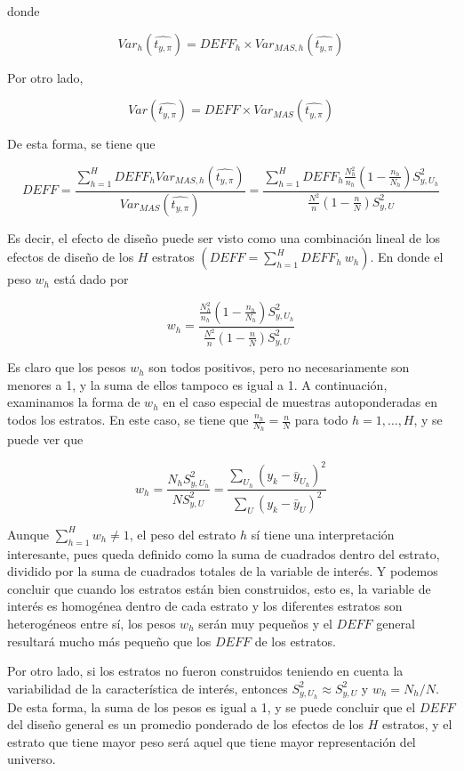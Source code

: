 \documentclass[
  12pt,
]{book}
\begin{document}
donde

\[
{Var}_h\left(\widehat{t_{y,\pi}}\right)={DEFF}_h \times {Var}_{MAS,h}\left(\widehat{t_{y,\pi}}\right)
\]

Por otro lado,

\[
Var\left(\widehat{t_{y,\pi}}\right)=DEFF \times {Var}_{MAS}\left(\widehat{t_{y,\pi}}\right)
\]

De esta forma, se tiene que

\[
DEFF=\frac{\sum_{h=1}^{H}DEFF_h{Var}_{MAS,h}\left(\widehat{t_{y,\pi}}\right)}{Var_{MAS}\left(\widehat{t_{y,\pi}}\right)}=\frac{\sum_{h=1}^{H}DEFF_h\frac{N_h^2}{n_h}(1-\frac{n_h}{N_h})S_{y,U_h}^2}{\frac{N^2}{n}(1-\frac{n}{N})S_{y,U}^2}
\]

Es decir, el efecto de diseño puede ser visto como una combinación lineal de los efectos de diseño de los \(H\) estratos \((DEFF=\sum_{h=1}^{H} DEFF_h \ w_h)\). En donde el peso \(w_h\) está dado por

\[
w_h=\frac{\frac{N_h^2}{n_h}(1-\frac{n_h}{N_h})S_{y,U_h}^2}{\frac{N^2}{n}(1-\frac{n}{N})S_{y,U}^2}
\]

Es claro que los pesos \(w_h\) son todos positivos, pero no necesariamente son menores a 1, y la suma de ellos tampoco es igual a 1. A continuación, examinamos la forma de \(w_h\) en el caso especial de muestras autoponderadas en todos los estratos. En este caso, se tiene que \(\frac{n_h}{N_h}=\frac{n}{N}\) para todo \(h=1,\ldots,H\), y se puede ver que

\[
w_h=\frac{N_hS_{y,U_h}^2}{NS_{y,U}^2}=\frac{\sum_{U_h}{(y_k-{\bar{y}}_{U_h})}^2}{\sum_{U}{(y_k-{\bar{y}}_U)}^2}
\]

Aunque \(\sum_{h=1}^{H}w_h\neq 1\), el peso del estrato \(h\) sí tiene una interpretación interesante, pues queda definido como la suma de cuadrados dentro del estrato, dividido por la suma de cuadrados totales de la variable de interés. Y podemos concluir que cuando los estratos están bien construidos, esto es, la variable de interés es homogénea dentro de cada estrato y los diferentes estratos son heterogéneos entre sí, los pesos \(w_h\) serán muy pequeños y el \(DEFF\) general resultará mucho más pequeño que los \(DEFF\) de los estratos.

Por otro lado, si los estratos no fueron construidos teniendo en cuenta la variabilidad de la característica de interés, entonces \(S_{y,U_h}^2\approx S_{y,U}^2\) y \(w_h=N_h/N\). De esta forma, la suma de los pesos es igual a 1, y se puede concluir que el \(DEFF\) del diseño general es un promedio ponderado de los efectos de los \(H\) estratos, y el estrato que tiene mayor peso será aquel que tiene mayor representación del universo.
\end{document}
